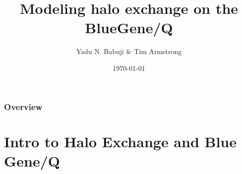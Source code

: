 \documentclass{beamer}
\title[Halo exchange on BG/Q]{Modeling halo exchange on the BlueGene/Q} %
\author{Yadu N. Babuji \& Tim Armstrong} %
\institute[Dept. of Computer Science]
{
The University of Chicago \\
\medskip
}
\date{\today} %
\begin{document}
\begin{frame}
\titlepage %
\end{frame}

\begin{frame}
\frametitle{Overview} %
\tableofcontents %
\end{frame}


\section{Intro to Halo Exchange and Blue Gene/Q} %
\end{document}

